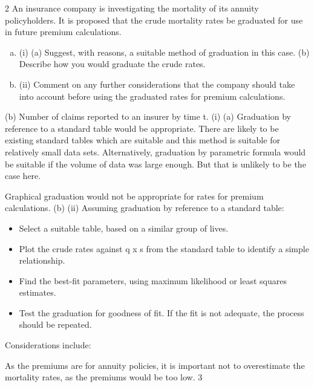 \documentclass[a4paper,12pt]{article}
\begin{document}
2
An insurance company is investigating the mortality of its annuity policyholders. It is
proposed that the crude mortality rates be graduated for use in future premium
calculations.

\begin{enumerate}[(a)]
\item (i)
(a) Suggest, with reasons, a suitable method of graduation in this case.
(b) Describe how you would graduate the crude rates.
\item 
(ii)
Comment on any further considerations that the company should take into
account before using the graduated rates for premium calculations.
\end{enumerate}

(b) Number of claims reported to an insurer by time t.
(i) (a)
Graduation by reference to a standard table would be appropriate.
There are likely to be existing standard tables which are suitable and this method is suitable for relatively small data sets.
Alternatively, graduation by parametric formula would be suitable if the volume of data was large enough. But that is unlikely to be the
case here.

Graphical graduation would not be appropriate for rates for premium calculations.
(b)
(ii)
Assuming graduation by reference to a standard table:
\begin{itemize}
\item Select a suitable table, based on a similar group of lives.
\item Plot the crude rates against q x s from the standard table to identify a simple relationship.
\item Find the best-fit parameters, using maximum likelihood or least squares estimates.
\item Test the graduation for goodness of fit. If the fit is not adequate, the process should be repeated.
\end{itemize}
Considerations include:
\item
As the premiums are for annuity policies, it is important not to
overestimate the mortality rates, as the premiums would be too low.
3
\end{document}
